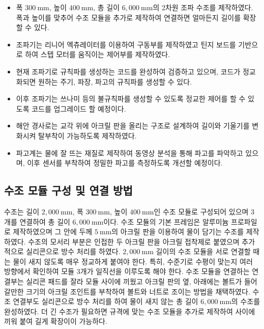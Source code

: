 \begin{itemize}
    \item 폭 $300~\mathrm{mm}$, 높이 $400~\mathrm{mm}$, 총 길이 $6,000~\mathrm{mm}$의 2차원 조파 수조를 제작하였다. 폭과 높이를 맞추어 수조 모듈을 추가로 제작하여 연결하면 얼마든지 길이를 확장할 수 있다. 
    \item 조파기는 리니어 엑츄레이터를 이용하여 구동부를 제작하였고 틴지 보드를 기반으로 하여 스텝 모터를 움직이는 제어부를 제작하였다. 
    \item 현재 조파기로 규칙파를 생성하는 코드를 완성하여 검증하고 있으며, 코드가 정교화되면 원하는 주기, 파장, 파고의 규칙파를 생성할 수 있다. 
    \item 이후 조파기는 쓰나미 등의 불규칙파를 생성할 수 있도록 정교한 제어를 할 수 있도록 코드를 업그레이드 할 예정이다. 
    \item 해안 경사로는 교각 위에 아크릴 판을 올리는 구조로 설계하여 길이와 기울기를 변화시켜 탈부착이 가능하도록 제작하였다. 
    \item 파고계는 물에 잘 뜨는 재질로 제작하여 동영상 분석을 통해 파고를 파악하고 있으며, 이후 센서를 부착하여 정밀한 파고를 측정하도록 개선할 예정이다.
\end{itemize}

\subsection{수조 모듈 구성 및 연결 방법}
수조는 길이 $2,000~\mathrm{mm}$, 폭 $300~\mathrm{mm}$, 높이 $400~\mathrm{mm}$인 수조 모듈로 구성되어 있으며 3개를 연결하여 총 길이 $6,000~\mathrm{mm}$이다. 수조 모듈의 기본 프레임은 알루미늄 프로파일로 제작하였으며 그 안에 두께 $5~\mathrm{mm}$의 아크릴 판을 이용하여 물이 담기는 수조를 제작하였다. 수조의 모서리 부분은 인접한 두 아크릴 판을 아크릴 접착제로 붙였으며 추가적으로 실리콘으로 방수 처리를 하였다. $2,000~\mathrm{mm}$ 길이의 수조 모듈을 서로 연결할 때는 물이 새지 않도록 매우 정교하게 붙여야 한다. 특히, 수준기로 수평이 맞는지 여러 방향에서 확인하여 모듈 3개가 일직선을 이루도록 해야 한다. 수조 모듈을 연결하는 연결부는 실리콘 패드를 잘라 모듈 사이에 끼웠고 아크릴 판의 옆, 아래에는 볼트가 들어갈만한 크기의 아크릴 조인트를 부착하여 볼트와 너트로 조이는 방법을 채택하였다. 수조 연결부도 실리콘으로 방수 처리를 하여 물이 새지 않는 총 길이 $6,000~\mathrm{mm}$의 수조를 완성하였다. 더 긴 수조가 필요하면 규격에 맞는 수조 모듈을 추가로 제작하여 사이에 끼워 붙여 길게 확장이이 가능하다.

